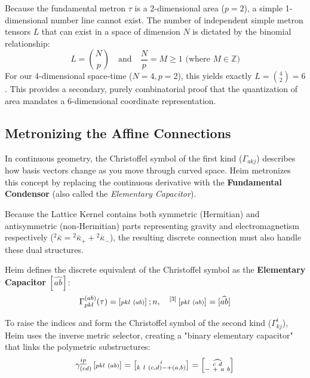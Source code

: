 \documentclass[11pt,a4paper,oneside]{article}
\newcommand{\metroncap}[4][]{%
    \left[ \renewcommand{\arraystretch}{0.85} \substack{#2 \\ #3 \ #4} \right]_{#1}%
}
\begin{document}
Because the fundamental metron $\tau$ is a 2-dimensional area ($p=2$), a simple 1-dimensional number line cannot exist. The number of independent simple metron tensors $L$ that can exist in a space of dimension $N$ is dictated by the binomial relationship:
\begin{equation}
    L = \binom{N}{p} \quad \text{and} \quad \frac{N}{p} = M \ge 1 \text{ (where } M \in \mathbb{Z} \text{)}
\end{equation}
For our 4-dimensional space-time ($N=4, p=2$), this yields exactly $L = \binom{4}{2} = 6$. This provides a secondary, purely combinatorial proof that the quantization of area mandates a 6-dimensional coordinate representation.
\subsection{Metronizing the Affine Connections}

In continuous geometry, the Christoffel symbol of the first kind ($\Gamma_{akj}$) describes how basis vectors change as you move through curved space. Heim metronizes this concept by replacing the continuous derivative with the \textbf{Fundamental Condensor} (also called the \textit{Elementary Capacitor}).

Because the Lattice Kernel contains both symmetric (Hermitian) and antisymmetric (non-Hermitian) parts representing gravity and electromagnetism respectively (${}^2 \bar{\kappa} = {}^2 \bar{\kappa}_+ + {}^2 \bar{\kappa}_-$), the resulting discrete connection must also handle these dual structures.

Heim defines the discrete equivalent of the Christoffel symbol as the \textbf{Elementary Capacitor} $[\widehat{ab}]$:
\begin{equation}
    \Gamma_{pkl}^{(ab)}(\tau) = \metroncap{ }{pkl}{(ab)}; n, \quad {}^{[3]}\metroncap{ }{pkl}{(ab)} = [\widehat{ab}]
\end{equation}

To raise the indices and form the Christoffel symbol of the second kind ($\Gamma^i_{kj}$), Heim uses the inverse metric selector, creating a "binary elementary capacitor" that links the polymetric substructures:
\begin{equation}
    \gamma_{(cd)}^{\underline{ip}}\metroncap{ }{pkl}{(ab)} = \metroncap{i}{k\ l}{(c,d) - + (a,b)} = \metroncap{\widehat{c \ d}}{- \ +}{a \ b}
\end{equation}
\end{document}

